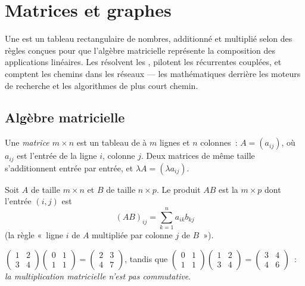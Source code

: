 \chapter{Matrices et graphes}\label{ch:g12:matrix}

Une  est un tableau rectangulaire de nombres, additionné et multiplié
selon des règles conçues pour que l'algèbre matricielle représente la
composition des applications linéaires. Les  résolvent les , pilotent les  récurrentes couplées, et comptent les
chemins dans les réseaux --- les mathématiques derrière les moteurs de
recherche et les algorithmes de plus court chemin.

\section{Algèbre matricielle}

\begin{definition}[Matrice]\label{def:g12:matrix:matrix}
Une \emph{matrice $m \times n$} est un tableau de  à $m$ lignes et $n$ colonnes~:
$A = (a_{ij})$, où $a_{ij}$ est l'entrée de la ligne $i$, colonne $j$.
Deux matrices de même taille s'additionnent entrée par entrée, et
$\lambda A = (\lambda a_{ij})$.
\end{definition}

\begin{definition}\label{def:g12:matrix:product}
Soit $A$ de taille $m \times n$ et $B$ de taille $n \times p$. Le produit
$AB$ est la  $m \times p$ dont l'entrée $(i,j)$ est
\[
(AB)_{ij} = \sum_{k=1}^{n} a_{ik} b_{kj}
\]
(la règle «~ligne $i$ de $A$ multipliée par colonne $j$ de $B$~»).
\end{definition}

\begin{example}
$\begin{pmatrix} 1 & 2\\ 3 & 4\end{pmatrix}
\begin{pmatrix} 0 & 1\\ 1 & 1\end{pmatrix}
= \begin{pmatrix} 2 & 3\\ 4 & 7\end{pmatrix}$,
\quad tandis que \quad
$\begin{pmatrix} 0 & 1\\ 1 & 1\end{pmatrix}
\begin{pmatrix} 1 & 2\\ 3 & 4\end{pmatrix}
= \begin{pmatrix} 3 & 4\\ 4 & 6\end{pmatrix}$~:
\emph{la multiplication matricielle n'est pas commutative}.
\end{example}

